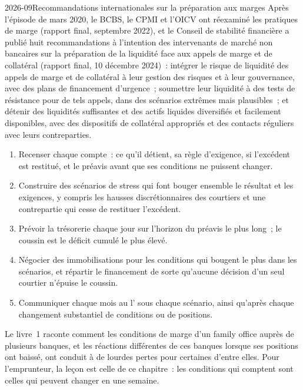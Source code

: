 \begin{dated}{2026-09}{Recommandations internationales sur la préparation aux marges}\label{dat:fm:treasury-and-funding:fsb}
Après l'épisode de mars 2020, le BCBS, le CPMI et l'OICV ont réexaminé les pratiques de marge (rapport final, septembre 2022), et le Conseil de stabilité financière
a publié huit recommandations à l'intention des intervenants de marché non bancaires sur la préparation de la liquidité face aux appels de marge et de collatéral (rapport final, 10
décembre 2024)~: intégrer le risque de liquidité des appels de marge et de collatéral à leur gestion des risques et à leur gouvernance, avec des plans de financement d'urgence~;
soumettre leur liquidité à des tests de résistance pour de tels appels, dans des scénarios extrêmes mais plausibles~; et détenir des liquidités suffisantes et des actifs liquides
diversifiés et facilement disponibles, avec des dispositifs de collatéral appropriés et des contacts réguliers avec leurs contreparties.
\end{dated}

\begin{method}\label{met:fm:treasury-and-funding:buffer}
\begin{enumerate}
\item Recenser chaque compte~: ce qu'il détient, sa règle d'exigence, si l'excédent est restitué, et le préavis avant que ses conditions ne puissent changer.
\item Construire des scénarios de stress qui font bouger ensemble le résultat et les exigences, y compris les hausses discrétionnaires des courtiers et une contrepartie qui cesse
de restituer l'excédent.
\item Prévoir la trésorerie chaque jour sur l'horizon du préavis le plus long~; le coussin est le déficit cumulé le plus élevé.
\item Négocier des immobilisations pour les conditions qui bougent le plus dans les scénarios, et répartir le financement de sorte qu'aucune décision d'un seul courtier n'épuise le coussin.
\item Communiquer chaque mois au  l' sous chaque scénario, ainsi qu'après chaque changement substantiel de conditions ou de positions.
\end{enumerate}
\end{method}

Le livre~1 raconte comment les conditions de marge d'un family office auprès de plusieurs banques, et les réactions différentes de ces banques lorsque ses positions ont baissé, ont conduit à de
lourdes pertes pour certaines d'entre elles. Pour l'emprunteur, la leçon est celle de ce chapitre~: les conditions qui comptent sont celles qui peuvent changer
en une semaine.

